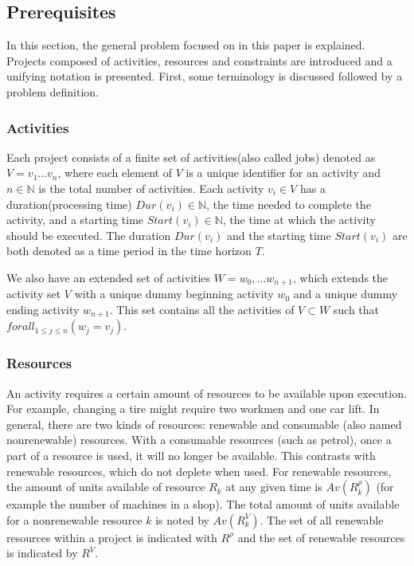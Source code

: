 \documentclass{article}
\begin{document}
\subsection{Prerequisites}
In this section, the general problem focused on in this paper is explained.
Projects composed of activities, resources and constraints are introduced and a unifying notation is presented.
First, some terminology is discussed followed by a problem definition.

\subsubsection{Activities}
Each project consists of a finite set of activities(also called jobs) denoted as $V = v_1 \ldots v_n$, where each element of $V$ is a unique identifier for an activity and $n \in \mathbb{N}$ is the total number of activities.
Each activity $v_i \in V$ has a duration(processing time) $Dur(v_i) \in \mathbb{N}$, the time needed to complete the activity, and a starting time $Start(v_i) \in \mathbb{N}$, the time at which the activity should be executed. The duration $Dur(v_i)$ and the starting time $Start(v_i)$ are both denoted as a time period in the time horizon $T$.

We also have an extended set of activities $W = w_0, \ldots w_{n+1}$, which extends the activity set $V$ with a unique dummy beginning activity $w_0$ and a unique dummy ending activity $w_{n+1}$. This set contains all the activities of $V \subset W$ such that $forall_{1 \leq j \leq n}(w_j = v_j)$.

\subsubsection{Resources}
An activity requires a certain amount of resources to be available upon execution.
For example, changing a tire might require two workmen and one car lift.
In general, there are two kinds of resources: renewable and consumable (also named nonrenewable) resources.
With a consumable resources (such as petrol), once a part of a resource is used, it will no longer be available.
This contrasts with renewable resources, which do not deplete when used.
For renewable resources, the amount of units available of resource $R_k$ at any given time is $Av(R^{\rho}_k)$ (for example the number of machines in a shop).
The total amount of units available for a nonrenewable resource $k$ is noted by $Av(R^{V}_k)$.
The set of all renewable resources within a project is indicated with $R^{\rho}$ and the set of renewable resources is indicated by $R^{V}$. 
\end{document}
